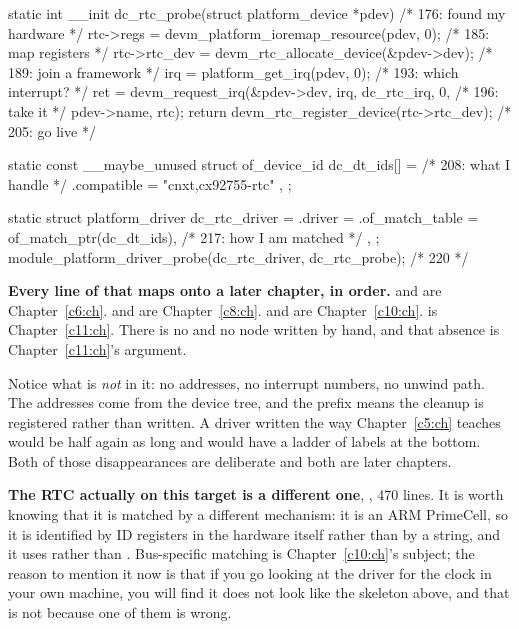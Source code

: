 \begin{ccode}
static int __init dc_rtc_probe(struct platform_device *pdev)      /* 176: found my hardware */
{
        rtc->regs = devm_platform_ioremap_resource(pdev, 0);      /* 185: map registers   */
        rtc->rtc_dev = devm_rtc_allocate_device(&pdev->dev);      /* 189: join a framework */
        irq = platform_get_irq(pdev, 0);                          /* 193: which interrupt? */
        ret = devm_request_irq(&pdev->dev, irq, dc_rtc_irq, 0,    /* 196: take it          */
                               pdev->name, rtc);
        return devm_rtc_register_device(rtc->rtc_dev);            /* 205: go live          */
}

static const __maybe_unused struct of_device_id dc_dt_ids[] = {   /* 208: what I handle    */
        { .compatible = "cnxt,cx92755-rtc" },
        { }
};

static struct platform_driver dc_rtc_driver = {
        .driver = {
                .of_match_table = of_match_ptr(dc_dt_ids),        /* 217: how I am matched */
        },
};
module_platform_driver_probe(dc_rtc_driver, dc_rtc_probe);        /* 220                   */
\end{ccode}

\noindent \textbf{Every line of that maps onto a later chapter, in order.}  and
 are Chapter~\ref{c6:ch}.  and  are
Chapter~\ref{c8:ch}.  and  are Chapter~\ref{c10:ch}.
 is Chapter~\ref{c11:ch}. There is no  and no
 node written by hand, and that absence is Chapter~\ref{c11:ch}'s argument.

Notice what is \emph{not} in it: no addresses, no interrupt numbers, no unwind path. The addresses
come from the device tree, and the  prefix means the cleanup is registered rather than
written. A driver written the way Chapter~\ref{c5:ch} teaches would be half again as long and would
have a ladder of  labels at the bottom. Both of those disappearances are deliberate and
both are later chapters.

\textbf{The RTC actually on this target is a different one}, , 470
lines. It is worth knowing that it is matched by a different mechanism: it is an ARM PrimeCell, so
it is identified by ID registers in the hardware itself rather than by a  string,
and it uses  rather than . Bus-specific matching is
Chapter~\ref{c10:ch}'s subject; the reason to mention it now is that if you go looking at the driver
for the clock in your own machine, you will find it does not look like the skeleton above, and that
is not because one of them is wrong.


